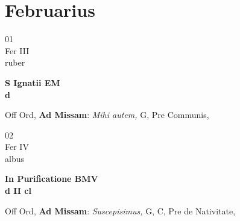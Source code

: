 \documentclass[10pt, openany]{book}
\begin{document}
        \chapter{Februarius}
                        
        \begin{center}
            \begin{minipage}{3.5in}
                \vspace{2em}
                \begin{minipage}{0.5in}
                    {\Huge 01} \\
                    {\normalsize Fer III} \\
                    {\normalsize ruber}
                \end{minipage}
                \begin{minipage}{3.0in}
                    \textbf{ \large S Ignatii EM \\
                    \textnormal{\normalsize d}} \\ 
                \end{minipage}
                \begin{justify}Off Ord, \textbf{Ad Missam}: \textit{Mihi autem,} G, Pre Communis,   
                \end{justify}
            \end{minipage}
        \end{center}
    
        \begin{center}
            \begin{minipage}{3.5in}
                \vspace{2em}
                \begin{minipage}{0.5in}
                    {\Huge 02} \\
                    {\normalsize Fer IV} \\
                    {\normalsize albus}
                \end{minipage}
                \begin{minipage}{3.0in}
                    \textbf{ \large In Purificatione BMV \\
                    \textnormal{\normalsize d II cl}} \\ 
                \end{minipage}
                \begin{justify}Off Ord, \textbf{Ad Missam}: \textit{Suscepisimus,} G, C, Pre de Nativitate,   
                \end{justify}
            \end{minipage}
        \end{center}
    
\end{document}
